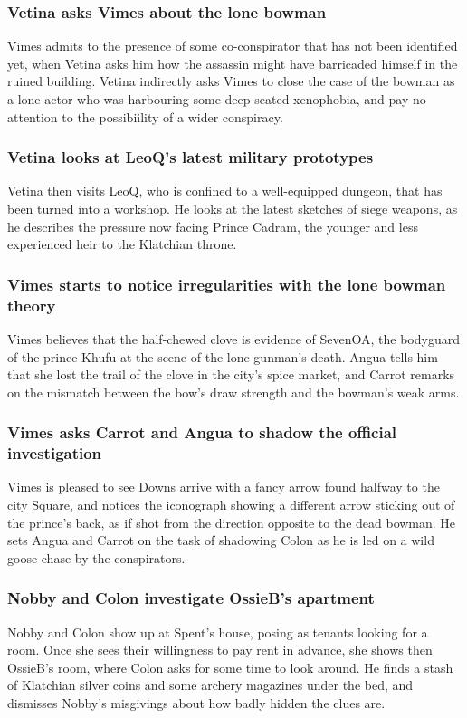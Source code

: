 \subsubsection{\Gls{Vetina} asks \Gls{Vimes} about the lone bowman}
\Gls{Vimes} admits to the presence of some co-conspirator that has not been identified yet, when
\Gls{Vetina} asks him how the assassin might have barricaded himself in the ruined building.
\Gls{Vetina} indirectly asks \Gls{Vimes} to close the case of the bowman as a lone actor who was
harbouring some deep-seated xenophobia, and pay no attention to the possibiility of a wider
conspiracy.

\subsubsection{\Gls{Vetina} looks at \Gls{LeoQ}'s latest military prototypes}
\Gls{Vetina} then visits \Gls{LeoQ}, who is confined to a well-equipped dungeon, that has been
turned into a workshop. He looks at the latest sketches of siege weapons, as he describes the
pressure now facing Prince \Gls{Cadram}, the younger and less experienced heir to the Klatchian
throne.

\subsubsection{\Gls{Vimes} starts to notice irregularities with the lone bowman theory}
\Gls{Vimes} believes that the half-chewed clove is evidence of \Gls{SevenOA}, the bodyguard of the
prince \Gls{Khufu} at the scene of the lone gunman's death. \Gls{Angua} tells him that she lost
the trail of the clove in the city's spice market, and \Gls{Carrot} remarks on the mismatch
between the bow's draw strength and the bowman's weak arms.

\subsubsection{\Gls{Vimes} asks \Gls{Carrot} and \Gls{Angua} to shadow the official investigation}
\Gls{Vimes} is pleased to see \Gls{Downs} arrive with a fancy arrow found halfway to the city
Square, and notices the iconograph showing a different arrow sticking out of the prince's back, as
if shot from the direction opposite to the dead bowman. He sets \Gls{Angua} and \Gls{Carrot} on
the task of shadowing \Gls{Colon} as he is led on a wild goose chase by the conspirators.

\subsubsection{\Gls{Nobby} and \Gls{Colon} investigate \Gls{OssieB}'s apartment}
\Gls{Nobby} and \Gls{Colon} show up at \Gls{Spent}'s house, posing as tenants looking for a room.
Once she sees their willingness to pay rent in advance, she shows then \Gls{OssieB}'s room, where
\Gls{Colon} asks for some time to look around. He finds a stash of Klatchian silver coins and some
archery magazines under the bed, and dismisses \Gls{Nobby}'s misgivings about how badly hidden the
clues are.

